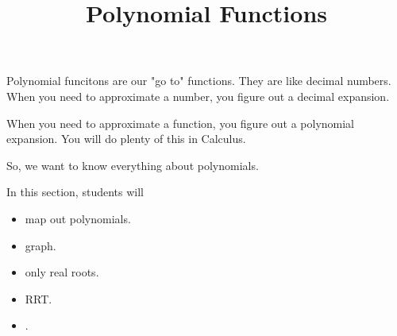 \documentclass{ximera}
\title{Polynomial Functions}
\begin{document}
\begin{abstract}
\end{abstract}
\maketitle






Polynomial funcitons are our "go to" functions.  They are like decimal numbers.  When you need to approximate a number, you figure out a decimal expansion.

When you need to approximate a function, you figure out a polynomial expansion. You will do plenty of this in Calculus.

So, we want to know everything about polynomials.


















\begin{sectionOutcomes}
In this section, students will 

\begin{itemize}
\item map out polynomials.
\item graph.
\item only real roots.
\item RRT.
\item .
\end{itemize}
\end{sectionOutcomes}
\end{document}
